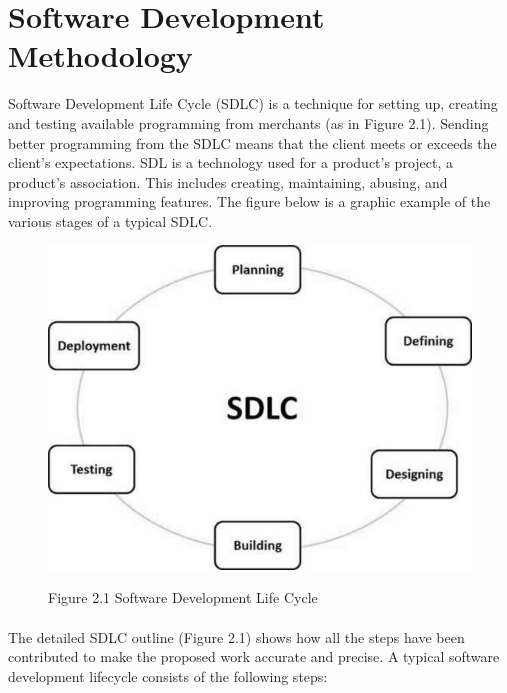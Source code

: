 \documentclass[oneside,12pt]{Classes/VTU}
\begin{document}
    \section{Software Development Methodology}
    	Software Development Life Cycle (SDLC) is a technique for setting up, creating and testing available programming from merchants (as in Figure 2.1). Sending better programming from the SDLC means that the client meets or exceeds the client's expectations. SDL is a technology used for a product's project, a product's association. This includes creating, maintaining, abusing, and improving programming features. The figure below is a graphic example of the various stages of a typical SDLC.
    	
    	\begin{figure}
    		\begin{center}
    			\includegraphics[scale=0.8]{images/sdlc.png}
    		\end{center}
    		
    		
    		\begin{center}
    			Figure 2.1 Software Development Life Cycle
    		\end{center}
    	\end{figure}
    
    	\paragraph{}
    	The detailed SDLC outline (Figure 2.1) shows how all the steps have been contributed to make the proposed work accurate and precise.
    	A typical software development lifecycle consists of the following steps:
    	
\end{document}
